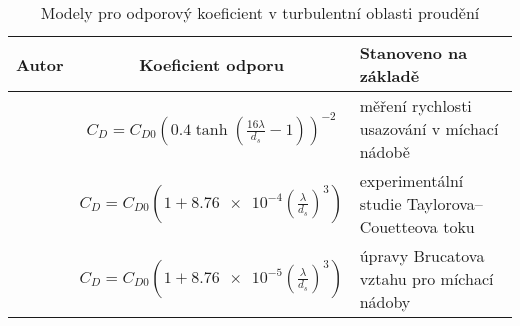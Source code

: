 \begin{table}[h!]
\begin{center}
  
		\hypertarget{hyp:cds}{}
		\caption{Modely pro odporový koeficient v turbulentní oblasti proudění}
		\label{tab:cds}
\begin{tabular}{|c|c|>{\centering\arraybackslash}p{5cm}|}
  \hline
  
{\textbf{Autor}} & {\textbf{Koeficient odporu}} & {\textbf{Stanoveno na základě}} \\ \hline{}

\citet{pin01} & $C_{D} = C_{D0} \left( \num{0.4}\tanh\left(  \frac{16\lambda}{d_{s}} - 1  \right) \right) ^{-2}$ & měření rychlosti usazování v míchací nádobě \\ \hline
 
\citet{bru98} & $C_{D} = C_{D0} \left( 1 + \num{8.76e-4} \left( \frac{\lambda}{d_{s}} \right)^{3} \right)$ & experimentální studie Taylorova–Couetteova toku \\ \hline 

\citet{kho06} & $C_{D} = C_{D0} \left( 1 + \num{8.76e-5} \left( \frac{\lambda}{d_{s}} \right)^{3} \right)$ & úpravy Brucatova vztahu pro míchací nádoby  \\ \hline 

\end{tabular}
\end{center}
\end{table}








